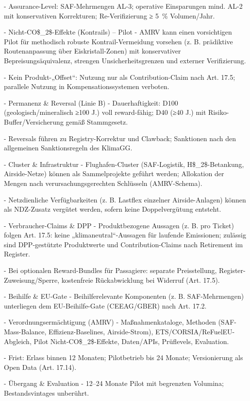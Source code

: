 \documentclass[12pt,a4paper]{scrartcl}
\begin{document}
- Assurance-Level: SAF-Mehrmengen AL-3; operative Einsparungen mind. AL-2 mit konservativen Korrekturen; Re-Verifizierung ≥ 5 \% Volumen/Jahr.

- Nicht-CO\$\_2\$-Effekte (Kontrails) -- Pilot
- AMRV kann einen vorsichtigen Pilot für methodisch robuste Kontrail-Vermeidung vorsehen (z. B. prädiktive Routenanpassung über Eiskristall-Zonen) mit konservativer Bepreisungsäquivalenz, strengen Unsicherheitsgrenzen und externer Verifizierung.

- Kein Produkt-„Offset“: Nutzung nur als Contribution-Claim nach Art. 17.5; parallele Nutzung in Kompensationssystemen verboten.

- Permanenz \& Reversal (Linie B)
- Dauerhaftigkeit: D100 (geologisch/mineralisch ≥100 J.) voll reward-fähig; D40 (≥40 J.) mit Risiko-Buffer/Versicherung gemäß Stammgesetz.

- Reversals führen zu Registry-Korrektur und Clawback; Sanktionen nach den allgemeinen Sanktionsregeln des KlimaGG.

- Cluster \& Infrastruktur
- Flughafen-Cluster (SAF-Logistik, H\$\_2\$-Betankung, Airside-Netze) können als Sammelprojekte geführt werden; Allokation der Mengen nach verursachungsgerechten Schlüsseln (AMRV-Schema).

- Netzdienliche Verfügbarkeiten (z. B. Lastflex einzelner Airside-Anlagen) können als NDZ-Zusatz vergütet werden, sofern keine Doppelvergütung entsteht.

- Verbraucher-Claims \& DPP
- Produktbezogene Aussagen (z. B. pro Ticket) folgen Art. 17.5: keine „klimaneutral“-Aussagen für laufende Emissionen; zulässig sind DPP-gestützte Produktwerte und Contribution-Claims nach Retirement im Register.

- Bei optionalen Reward-Bundles für Passagiere: separate Preisstellung, Register-Zuweisung/Sperre, kostenfreie Rückabwicklung bei Widerruf (Art. 17.5).

- Beihilfe \& EU-Gate
- Beihilferelevante Komponenten (z. B. SAF-Mehrmengen) unterliegen dem EU-Beihilfe-Gate (CEEAG/GBER) nach Art. 17.2.

- Verordnungsermächtigung (AMRV)
- Maßnahmenkataloge, Methoden (SAF-Mass-Balance, Effizienz-Baselines, Airside-Strom), ETS/CORSIA/ReFuelEU-Abgleich, Pilot Nicht-CO\$\_2\$-Effekte, Daten/APIs, Prüflevels, Evaluation.

- Frist: Erlass binnen 12 Monaten; Pilotbetrieb bis 24 Monate; Versionierung als Open Data (Art. 17.14).

- Übergang \& Evaluation
- 12--24 Monate Pilot mit begrenzten Volumina; Bestandsvintages unberührt.
\end{document}
